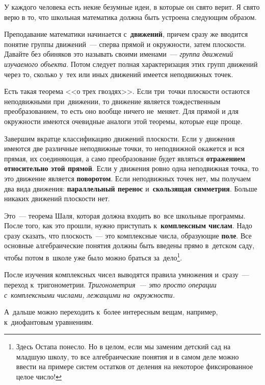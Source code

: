 У каждого человека есть некие безумные идеи, в которые он свято верит. Я свято
верю в то, что школьная математика должна быть устроена следующим образом.

Преподавание математики начинается с~\textbf{движений}, причем сразу же вводится понятие группы
движений~--- сперва прямой и окружности, затем плоскости. Давайте без обиняков это называть своими
именами~--- \textit{группа движений изучаемого объекта}. Потом следует полная характеризация этих
групп движений через то, сколько у~тех или иных движений имеется неподвижных точек.

Есть такая теорема <<о трех гвоздях>>.
Если три~точки плоскости остаются неподвижными при~движении,
то движение является тождественным преобразованием, то есть оно вообще ничего
не~меняет.
Для прямой и для
окружности имеются очевидные аналоги этой теоремы, которые еще проще.

Завершим вкратце классификацию движений плоскости. Если у движения имеются две различные неподвижные
точки, то неподвижной окажется и вся прямая,
 их соединяющая, а само преобразование будет являться
\textbf{отражением относительно этой прямой}. Если у движения ровно одна неподвижная точка, то это
движение является \textbf{поворотом}. Если неподвижных точек нет, мы получаем два вида движения:
\textbf{параллельный перенос} и~\textbf{скользящая симметрия}. Больше никаких движений плоскости нет.

Это~--- теорема Шаля, которая должна входить во~все школьные программы. После того, как это прошли, нужно
приступать к~\textbf{комплексным числам}. Надо сразу сказать, что плоскость~--- это комплексные числа,
образующие \textbf{поле}. Все основные алгебраические понятия должны быть введены прямо в~детском
саду, чтобы потом в~школе уже было можно браться за~дело\footnote{Здесь Остапа понесло. Но в целом, если мы
заменим детский сад на младшую школу, то все алгебраические понятия и в самом деле можно ввести на
примере систем остатков от деления на некоторое фиксированное целое число!}.

После изучения комплексных чисел выводятся правила умножения и~сразу~--- переход к~тригонометрии.
\textit{Тригонометрия~--- это просто операции с~комплексными числами, лежащими на~окружности.}

\pagebreak

А~дальше можно переходить к~более интересным вещам, например, к~диофантовым уравнениям.

